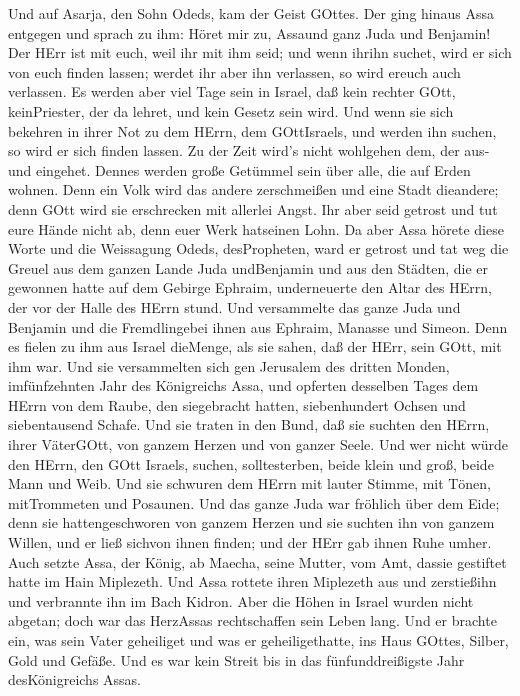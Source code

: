  Und auf Asarja, den Sohn Odeds, kam der Geist GOttes.
 Der ging hinaus Assa entgegen und sprach zu ihm: Höret mir
zu, Assaund ganz Juda und Benjamin! Der HErr ist mit euch, weil ihr mit
ihm seid; und wenn ihrihn suchet, wird er sich von euch finden lassen;
werdet ihr aber ihn verlassen, so wird ereuch auch verlassen.
 Es werden aber viel Tage sein in Israel, daß kein rechter
GOtt, keinPriester, der da lehret, und kein Gesetz sein wird.
 Und wenn sie sich bekehren in ihrer Not zu dem HErrn, dem
GOttIsraels, und werden ihn suchen, so wird er sich finden lassen.
 Zu der Zeit wird's nicht wohlgehen dem, der aus- und
eingehet. Dennes werden große Getümmel sein über alle, die auf Erden
wohnen.  Denn ein Volk wird das andere zerschmeißen und eine
Stadt dieandere; denn GOtt wird sie erschrecken mit allerlei Angst.
 Ihr aber seid getrost und tut eure Hände nicht ab, denn
euer Werk hatseinen Lohn.  Da aber Assa hörete diese Worte
und die Weissagung Odeds, desPropheten, ward er getrost und tat weg die
Greuel aus dem ganzen Lande Juda undBenjamin und aus den Städten, die er
gewonnen hatte auf dem Gebirge Ephraim, underneuerte den Altar des
HErrn, der vor der Halle des HErrn stund.  Und versammelte
das ganze Juda und Benjamin und die Fremdlingebei ihnen aus Ephraim,
Manasse und Simeon. Denn es fielen zu ihm aus Israel dieMenge, als sie
sahen, daß der HErr, sein GOtt, mit ihm war.  Und sie
versammelten sich gen Jerusalem des dritten Monden, imfünfzehnten Jahr
des Königreichs Assa,  und opferten desselben Tages dem
HErrn von dem Raube, den siegebracht hatten, siebenhundert Ochsen und
siebentausend Schafe.  Und sie traten in den Bund, daß sie
suchten den HErrn, ihrer VäterGOtt, von ganzem Herzen und von ganzer
Seele.  Und wer nicht würde den HErrn, den GOtt Israels,
suchen, solltesterben, beide klein und groß, beide Mann und Weib.
 Und sie schwuren dem HErrn mit lauter Stimme, mit Tönen,
mitTrommeten und Posaunen.  Und das ganze Juda war fröhlich
über dem Eide; denn sie hattengeschworen von ganzem Herzen und sie
suchten ihn von ganzem Willen, und er ließ sichvon ihnen finden; und der
HErr gab ihnen Ruhe umher.  Auch setzte Assa, der König, ab
Maecha, seine Mutter, vom Amt, dassie gestiftet hatte im Hain Miplezeth.
Und Assa rottete ihren Miplezeth aus und zerstießihn und verbrannte ihn
im Bach Kidron.  Aber die Höhen in Israel wurden nicht
abgetan; doch war das HerzAssas rechtschaffen sein Leben lang.
 Und er brachte ein, was sein Vater geheiliget und was er
geheiligethatte, ins Haus GOttes, Silber, Gold und Gefäße. 
Und es war kein Streit bis in das fünfunddreißigste Jahr desKönigreichs
Assas.

